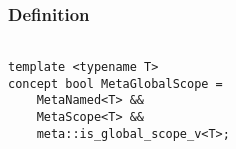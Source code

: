 
\subsubsection{Definition}

\begin{verbatim}

template <typename T>
concept bool MetaGlobalScope =
	MetaNamed<T> &&
	MetaScope<T> &&
	meta::is_global_scope_v<T>;

\end{verbatim}
